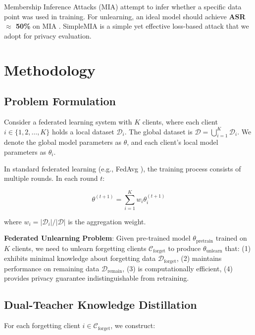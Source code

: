 \documentclass[10pt,twocolumn]{article}
\begin{document}
Membership Inference Attacks (MIA) \cite{shokri2017membership} attempt to infer whether a specific data point was used in training. For unlearning, an ideal model should achieve \textbf{ASR $\approx$ 50\%} on MIA \cite{bourtoule2021machine,wu2023federated}. SimpleMIA \cite{salem2019ml} is a simple yet effective loss-based attack that we adopt for privacy evaluation.

\section{Methodology}

\subsection{Problem Formulation}

Consider a federated learning system with $K$ clients, where each client $i \in \{1, 2, \ldots, K\}$ holds a local dataset $\mathcal{D}_i$. The global dataset is $\mathcal{D} = \bigcup_{i=1}^{K} \mathcal{D}_i$. We denote the global model parameters as $\theta$, and each client's local model parameters as $\theta_i$.

In standard federated learning (e.g., FedAvg \cite{mcmahan2017communication}), the training process consists of multiple rounds. In each round $t$:

\begin{equation}
\theta^{(t+1)} = \sum_{i=1}^{K} w_i \theta_i^{(t+1)}
\end{equation}

where $w_i = |\mathcal{D}_i|/|\mathcal{D}|$ is the aggregation weight.

\textbf{Federated Unlearning Problem}: Given pre-trained model $\theta_{\text{pretrain}}$ trained on $K$ clients, we need to unlearn forgetting clients $\mathcal{C}_{\text{forget}}$ to produce $\theta_{\text{unlearn}}$ that: (1) exhibits minimal knowledge about forgetting data $\mathcal{D}_{\text{forget}}$, (2) maintains performance on remaining data $\mathcal{D}_{\text{remain}}$, (3) is computationally efficient, (4) provides privacy guarantee indistinguishable from retraining.

\subsection{Dual-Teacher Knowledge Distillation}

For each forgetting client $i \in \mathcal{C}_{\text{forget}}$, we construct:
\end{document}

